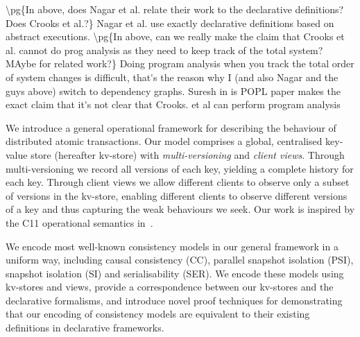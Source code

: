 \ac{
\pg{In above, does Nagar et al.  relate their work to the declarative
  definitions?
Does Crooks et al.?}
Nagar et al. use exactly declarative definitions based on abstract executions.
}
\ac{
\pg{In above, can we really make the claim that Crooks et al. cannot
  do prog analysis as  they need to keep track of the total system?
  MAybe for related work?}
Doing program analysis when you track the total order of system changes 
is difficult, that's the reason why I (and also Nagar and the guys above) switch 
to dependency graphs. Suresh in is POPL paper makes the exact claim that 
it's not clear that Crooks. et al can perform program analysis 
}


We introduce a general operational framework for describing the
behaviour of distributed {atomic} transactions. 
Our model comprises a global, centralised
key-value store (hereafter kv-store) with {\em multi-versioning} and {\em client views}.
Through multi-versioning we record all versions of each key, yielding a complete history for each key.
Through client views we allow different clients to observe only a subset of versions in the kv-store, 
enabling different clients to observe different versions of a key and thus capturing the weak behaviours we seek. 
Our work is inspired by the C11 operational semantics in~\cite{viktor'spromises}.


We encode most well-known consistency models in our general framework in a uniform way, including causal consistency (CC), parallel snapshot isolation
(PSI), snapshot isolation (SI) and serialisability (SER). 
We encode these models using kv-stores and views, 
provide a correspondence between our kv-stores and the declarative formalisms, 
and introduce novel proof techniques for demonstrating that our encoding of consistency models 
are equivalent to their existing definitions in declarative frameworks.
%
%

